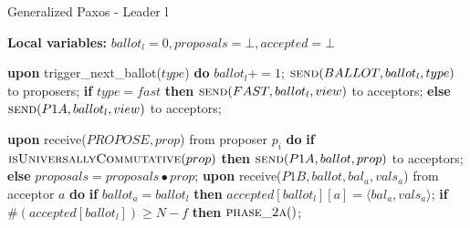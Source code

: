 \begin{algorithm} 
	\caption{Generalized Paxos - Leader l}
	\label{CFT-Lead}
	\textbf{Local variables:} $ballot_l = 0,proposals = \bot, accepted = \bot$
	\begin{algorithmic}[1]
		\State \textbf{upon} trigger\_next\_ballot($type$) \textbf{do}
		\State \hspace{\algorithmicindent} $ballot_l \mathrel{+{=}} 1$;
		\State \hspace{\algorithmicindent} $\Call{send}{BALLOT,ballot_l,type}$ to proposers;
		\State
		\State \hspace{\algorithmicindent} \textbf{if} $type = fast$ \textbf{then}
		\State \hspace{\algorithmicindent}\hspace{\algorithmicindent} $\Call{send}{FAST,ballot_l,view} $ to acceptors;
		\State \hspace{\algorithmicindent} \textbf{else}
		\State \hspace{\algorithmicindent}\hspace{\algorithmicindent} $\Call{send}{P1A, ballot_l, view}$ to acceptors;
		
		\State
		\State \textbf{upon} receive($PROPOSE, prop$) from proposer $p_i$ \textbf{do} 
		\State \hspace{\algorithmicindent} \textbf{if} $\Call{isUniversallyCommutative}{prop}$ \textbf{then}
		\State \hspace{\algorithmicindent}\hspace{\algorithmicindent} $\Call{send}{P1A, ballot, prop}$ to acceptors;
		\State \hspace{\algorithmicindent} \textbf{else}
		\State \hspace{\algorithmicindent}\hspace{\algorithmicindent} $proposals = proposals \bullet prop$;
		\State
		\State \textbf{upon} receive($P1B, ballot, bal_a,vals_a$) from acceptor $a$ \textbf{do}
		\State \hspace{\algorithmicindent} \textbf{if} $ballot_a = ballot_l$ \textbf{then}
		\State \hspace{\algorithmicindent}\hspace{\algorithmicindent} $accepted[ballot_l][a] =\langle bal_a, vals_a \rangle$;
		\State \hspace{\algorithmicindent}\hspace{\algorithmicindent} \textbf{if} $\#(accepted[ballot_l]) \geq N-f$ \textbf{then} 
		\State \hspace{\algorithmicindent}\hspace{\algorithmicindent}\hspace{\algorithmicindent} $\Call{phase\_2a}{ }$;
		

\end{algorithmic}
\end{algorithm}
